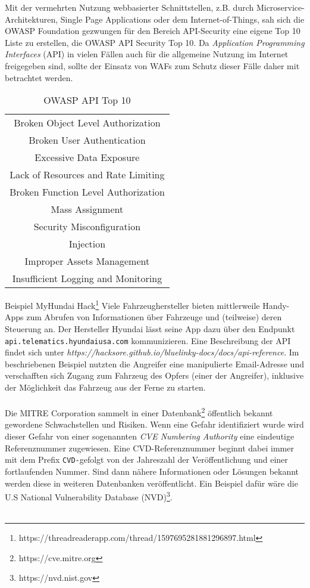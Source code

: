Mit der vermehrten Nutzung webbasierter Schnittstellen, z.B. durch Microservice-Architekturen, Single Page Applications oder dem Internet-of-Things, sah sich die OWASP Foundation gezwungen für den Bereich API-Security eine eigene Top 10 Liste zu erstellen, die OWASP API Security Top 10\cite{owaspapi10}. Da \emph{Application Programming Interfaces} (API) in vielen Fällen auch für die allgemeine Nutzung im Internet freigegeben sind, sollte der Einsatz von WAFs zum Schutz dieser Fälle daher mit betrachtet werden. 

\begin{table}[ht]
    \centering
    \begin{tabular}{|c|}
    \hline
         Broken Object Level Authorization   \\
         Broken User Authentication  \\
         Excessive Data Exposure  \\
         Lack of Resources and Rate Limiting  \\
         Broken Function Level Authorization  \\
         Mass Assignment  \\
         Security Misconfiguration  \\
         Injection  \\
         Improper Assets Management  \\
         Insufficient Logging and Monitoring  \\
         \hline
    \end{tabular}
    \caption{OWASP API Top 10}
    \label{tab:owaspapitop10}
\end{table}

\textcolor{bhtGray}{ Beispiel MyHundai Hack\footnote{https://threadreaderapp.com/thread/1597695281881296897.html}} Viele Fahrzeughersteller bieten mittlerweile Handy-Apps zum Abrufen von Informationen über Fahrzeuge und (teilweise) deren Steuerung an. Der Hersteller Hyundai lässt seine App dazu über den Endpunkt \texttt{api.telematics.hyundaiusa.com} kommunizieren. Eine Beschreibung der API findet sich unter \emph{https://hacksore.github.io/bluelinky-docs/docs/api-reference}. Im beschriebenen Beispiel nutzten die Angreifer eine manipulierte Email-Adresse und verschafften sich Zugang zum Fahrzeug des Opfers (einer der Angreifer), inklusive der Möglichkeit das Fahrzeug aus der Ferne zu starten. \\\\

Die MITRE Corporation sammelt in einer Datenbank\footnote{https://cve.mitre.org} öffentlich bekannt gewordene Schwachstellen und Risiken. Wenn eine Gefahr identifiziert wurde wird dieser Gefahr von einer sogenannten \emph{CVE Numbering Authority} eine eindeutige Referenznummer zugewiesen. Eine CVD-Referenznummer beginnt dabei immer mit dem Prefix \glqq\texttt{CVD-}\grqq gefolgt von der Jahreszahl der Veröffentlichung und einer fortlaufenden Nummer. Sind dann nähere Informationen oder Lösungen bekannt werden diese in weiteren Datenbanken veröffentlicht. Ein Beispiel dafür wäre die U.S National Vulnerability Database (NVD)\footnote{https://nvd.nist.gov}.\\\\

